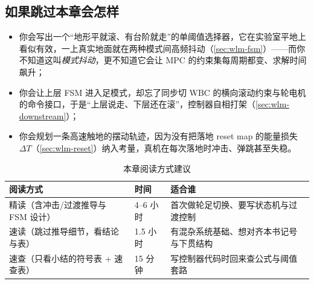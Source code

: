 \subsection*{如果跳过本章会怎样}
\begin{itemize}
  \item 你会写出一个“地形平就滚、有台阶就走”的单阈值选择器，它在实验室平地上看似有效，一上真实地面就在两种模式间高频抖动（\cref{sec:wlm-fsm}）——而你不知道这叫\emph{模式抖动}，更不知道它会让 MPC 的约束集每周期都变、求解时间飙升；
  \item 你会让上层 FSM 进入足模式，却忘了同步切 WBC 的横向滚动约束与轮电机的命令接口，于是“上层说走、下层还在滚”，控制器自相打架（\cref{sec:wlm-downstream}）；
  \item 你会规划一条高速触地的摆动轨迹，因为没有把落地 reset map 的能量损失 $\Delta T$（\cref{sec:wlm-reset}）纳入考量，真机在每次落地时冲击、弹跳甚至失稳。
\end{itemize}

\begin{table}[H]\centering\small
\caption{本章阅读方式建议}
\begin{tabular}{lll}
\toprule
阅读方式 & 时间 & 适合谁 \\
\midrule
精读（含冲击/过渡推导与 FSM 设计） & 4--6 小时 & 首次做轮足切换、要写状态机与过渡控制 \\
速读（跳过推导细节，看结论与表） & 1.5 小时 & 有混杂系统基础、想对齐本书记号与下贯结构 \\
速查（只看小结的符号表 + 速查表） & 15 分钟 & 写控制器代码时回来查公式与阈值套路 \\
\bottomrule
\end{tabular}
\end{table}

